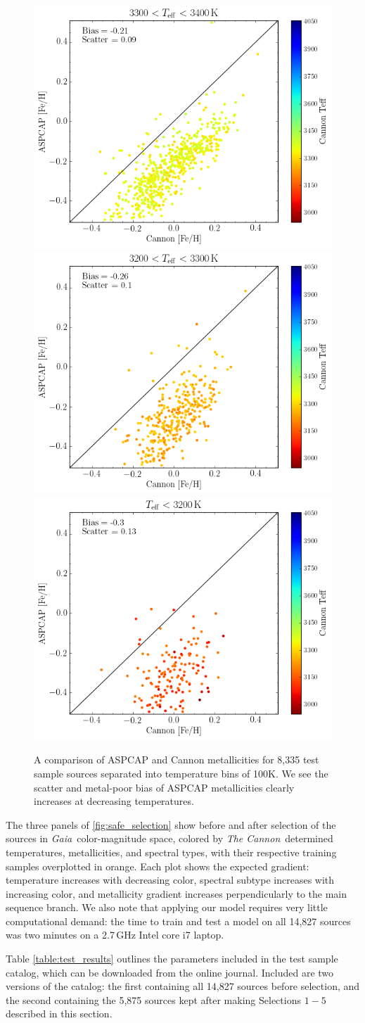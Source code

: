 \documentclass[twocolumn]{aastex62}
\newcommand{\thecannon}{\textsl{The Cannon}}
\newcommand{\gaia}{\textsl{Gaia}}
\begin{document}
\begin{figure}
\begin{center}
	\includegraphics[width=.3\linewidth]{figures/met_comp7.png}
	\includegraphics[width=.3\linewidth]{figures/met_comp8.png}
	\includegraphics[width=.3\linewidth]{figures/met_comp9.png} 
	\caption{A comparison of ASPCAP and Cannon metallicities for 8,335 test sample sources separated into temperature bins of 100K. We see the scatter and metal-poor bias of ASPCAP metallicities clearly increases at decreasing temperatures.} 
	\label{fig:met_comp}
\end{center}
\end{figure}


The three panels of \ref{fig:safe_selection} show before and after selection of the sources in \gaia\ color-magnitude space, colored by \thecannon\ determined temperatures, metallicities, and spectral types, with their respective training samples overplotted in orange. Each plot shows the expected gradient: temperature increases with decreasing color, spectral subtype increases with increasing color, and metallicity gradient increases perpendicularly to the main sequence branch. 
We also note that applying our model requires very little computational demand: the time to train and test a model on all 14,827 sources was two minutes on a 2.7\,GHz Intel core i7 laptop. 

Table \ref{table:test_results} outlines the parameters included in the test sample catalog, which can be downloaded from the online journal. Included are two versions of the catalog: the first containing all 14,827 sources before selection, and the second containing the 5,875 sources kept after making Selections $1-5$ described in this section.
\end{document}
